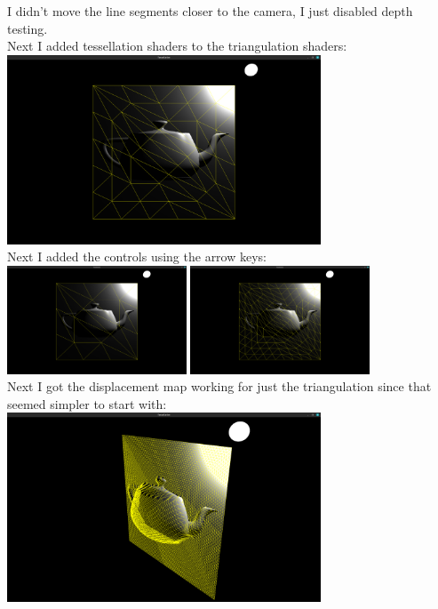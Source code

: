 \documentclass{article}
\begin{document}
I didn't move the line segments closer to the camera, I just disabled depth testing.\\[2mm]
Next I added tessellation shaders to the triangulation shaders:\\
\includegraphics[width=0.7\textwidth]{images/triangulationTessellation.png}\\[2mm]
Next I added the controls using the arrow keys:\\
\includegraphics[width=0.4\textwidth]{images/tessLevel4Triangulation.png}
\includegraphics[width=0.4\textwidth]{images/tessLevel9Triangulation.png}\\[2mm]
Next I got the displacement map working for just the triangulation since that seemed simpler to start with:\\
\includegraphics[width=0.7\textwidth]{images/displacementTriangulation.png}\\[2mm]
\end{document}
